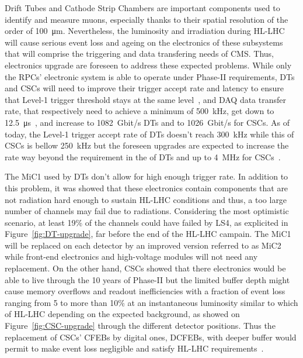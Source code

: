 	Drift Tubes and Cathode Strip Chambers are important components used to identify and measure muons, especially thanks to their spatial resolution of the order of \SI{100}{\micro m}. Nevertheless, the luminosity and irradiation during HL-LHC will cause serious event loss and ageing on the electronics of these subsystems that will comprise the triggering and data transfering needs of CMS. Thus, electronics upgrade are foreseen to address these expected problems. While only the RPCs' electronic system is able to operate under Phase-II requirements, DTs and CSCs will need to improve their trigger accept rate and latency to ensure that Level-1 trigger threshold stays at the same level~\cite{LEVEL1IR}, and DAQ data transfer rate, that respectively need to achieve a minimum of \SI{500}{kHz}, get down to \SI{12.5}{\micro s}~\cite{CMSIITP}, and increase to \SI{1082}{Gbit/s} DTs and to \SI{1026}{Gbit/s} for CSCs. As of today, the Level-1 trigger accept rate of DTs doesn't reach \SI{300}{kHz} while this of CSCs is bellow \SI{250}{kHz} but the foreseen upgrades are expected to increase the rate way beyond the requirement in the of DTs and up to \SI{4}{MHz} for CSCs~\cite{PHASEIITP}.
	
	The \acf{MiC1} used by DTs don't allow for high enough trigger rate. In addition to this problem, it was showed that these electronics contain components that are not radiation hard enough to sustain HL-LHC conditions and thus, a too large number of channels may fail due to radiations. Considering the most optimistic scenario, at least 19\% of the channels could have failed by LS4, as explicited in Figure~\ref{fig:DT-upgrade}, far before the end of the HL-LHC campain. The MiC1 will be replaced on each detector by an improved version referred to as MiC2 while front-end electronics and high-voltage modules will not need any replacement. On the other hand, CSCs showed that there electronics would be able to live through the 10 years of Phase-II but the limited buffer depth might cause memory overflows and readout inefficiencies with a fraction of event loss ranging from 5 to more than 10\% at an instantaneous luminosity similar to which of HL-LHC depending on the expected background, as showed on Figure~\ref{fig:CSC-upgrade} through the different detector positions. Thus the replacement of CSCs' \acf{CFEBs} by digital ones, DCFEBs, with deeper buffer would permit to make event loss negligible and satisfy HL-LHC requirements~\cite{PHASEIITP}.
	
